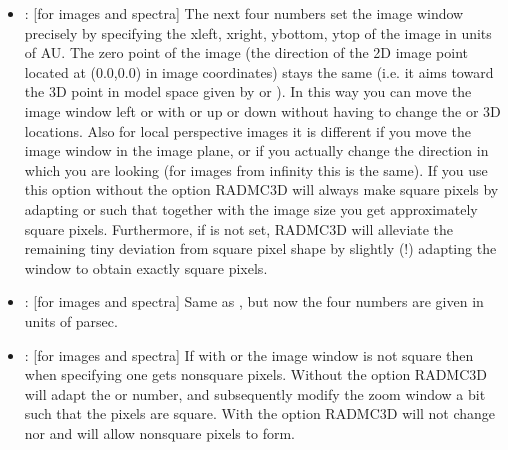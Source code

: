 \documentclass[letterpaper,10pt,english]{sphinxmanual}
\begin{document}
\begin{itemize}
\item {} 
: {[}for images and spectra{]} The next four numbers set the image
window precisely by specifying the xleft, xright, ybottom, ytop of the image
in units of AU. The zero point of the image (the direction of the 2\sphinxhyphen{}D image
point located at (0.0,0.0) in image coordinates) stays the same (i.e. it aims
toward the 3\sphinxhyphen{}D point in model space given by  or ). In
this way you can move the image window left or with or up or down without
having to change the  or  3\sphinxhyphen{}D locations. Also for local
perspective images it is different if you move the image window in the image
plane, or if you actually change the direction in which you are looking (for
images from infinity this is the same).  If you use this option
without the  option RADMC\sphinxhyphen{}3D will always make square pixels by
adapting  or  such that together with the  image
size you get approximately square pixels. Furthermore, if  is not
set, RADMC\sphinxhyphen{}3D will alleviate the remaining tiny deviation from square pixel
shape by slightly (!) adapting the  window to obtain exactly square
pixels.

\item {} 
: {[}for images and spectra{]} Same as , but
now the four numbers are given in units of parsec.

\item {} 
: {[}for images and spectra{]} If with  or  the
image window is not square then when specifying  one gets non\sphinxhyphen{}square
pixels. Without the  option RADMC\sphinxhyphen{}3D will adapt the  or
 number, and subsequently modify the zoom window a bit such that the
pixels are square. With the  option RADMC\sphinxhyphen{}3D will not change
 nor  and will allow non\sphinxhyphen{}square pixels to form.


\end{itemize}
\end{document}
